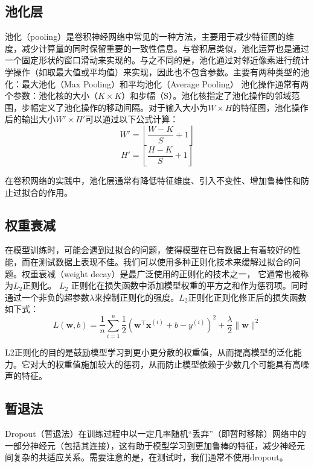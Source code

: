 \subsection{池化层}
池化（pooling）\cite{2022ComparisonPoolingMethodsConvolutionalNeuralNetworks}是卷积神经网络中常见的一种方法，主要用于减少特征图的维度，减少计算量的同时保留重要的一致性信息。与卷积层类似，池化运算也是通过一个固定形状的窗口滑动来实现的。与之不同的是，池化通过对邻近像素进行统计学操作（如取最大值或平均值）来实现，因此也不包含参数。主要有两种类型的池化：最大池化（Max Pooling）\cite{2011Maxpoolingconvolutionalneuralnetworksvisionbasedhandgesturerecognition}和平均池化（Average Pooling）\cite{2022ComparisonPoolingMethodsConvolutionalNeuralNetworks}
池化操作通常有两个参数：池化核的大小（\(K \times K\)）和步幅（S）。池化核指定了池化操作的邻域范围，步幅定义了池化操作的移动间隔。对于输入大小为$W \times H$的特征图，池化操作后的输出大小$W' \times H'$可以通过以下公式计算：
\begin{equation}
  W' = \left\lfloor\frac{W - K}{S} + 1\right\rfloor
\end{equation}
\begin{equation}
  H' = \left\lfloor\frac{H - K}{S} + 1\right\rfloor
\end{equation}

在卷积网络的实践中，池化层通常有降低特征维度、引入不变性、增加鲁棒性和防止过拟合的作用。

\subsection{权重衰减}
在模型训练时，可能会遇到过拟合的问题，使得模型在已有数据上有着较好的性能，而在测试数据上表现不佳。我们可以使用多种正则化技术来缓解过拟合的问题。权重衰减（weight decay）\cite{2012L2RegularizationLearningKernels}是最广泛使用的正则化的技术之一， 它通常也被称为$L_2$正则化。
$L_2$ 正则化在损失函数中添加模型权重的平方之和作为惩罚项。同时通过一个非负的超参数$\lambda$来控制正则化的强度。$L_2$正则化正则化修正后的损失函数如下式：
\begin{equation}
  L(\mathbf{w}, b)=\frac{1}{n} \sum_{i=1}^{n} \frac{1}{2}\left(\mathbf{w}^{\top} \mathbf{x}^{(i)}+b-y^{(i)}\right)^{2}+\frac{\lambda}{2}\|\mathbf{w}\|^{2}
\end{equation}

L2正则化的目的是鼓励模型学习到更小更分散的权重值，从而提高模型的泛化能力。它对大的权重值施加较大的惩罚，从而防止模型依赖于少数几个可能具有高噪声的特征。

\subsection{暂退法}
Dropout（暂退法）\cite{2012Improvingneuralnetworkspreventingcoadaptationfeaturedetectors}在训练过程中以一定几率随机“丢弃”（即暂时移除）网络中的一部分神经元（包括其连接），这有助于模型学习到更加鲁棒的特征，减少神经元间复杂的共适应关系。需要注意的是，在测试时，我们通常不使用dropout。
